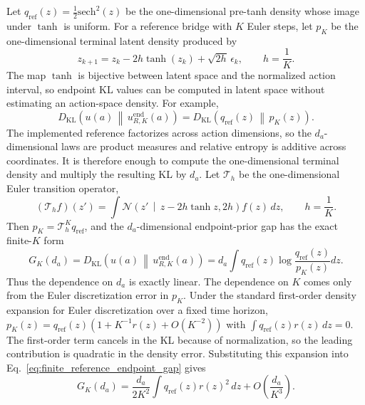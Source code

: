 \documentclass[11pt]{article}
\begin{document}
Let $q_{\mathrm{ref}}(z)=\frac{1}{2}\mathrm{sech}^2(z)$ be the one-dimensional pre-tanh density whose image under $\tanh$ is uniform. For a reference bridge with $K$ Euler steps, let $p_K$ be the one-dimensional terminal latent density produced by
\begin{equation}
  z_{k+1}
  =
  z_k
  -
  2h\tanh(z_k)
  +
  \sqrt{2h}\,\epsilon_k,
  \qquad h=\frac{1}{K}.
\end{equation}
The map $\tanh$ is bijective between latent space and the normalized action interval, so endpoint KL values can be computed in latent space without estimating an action-space density. For example,
\begin{equation}
  D_{\mathrm{KL}}\!\left(u(a)\,\middle\|\,u^{\mathrm{end}}_{R,K}(a)\right)
  =
  D_{\mathrm{KL}}\!\left(q_{\mathrm{ref}}(z)\,\middle\|\,p_K(z)\right).
\end{equation}
The implemented reference factorizes across action dimensions, so the $d_a$-dimensional laws are product measures and relative entropy is additive across coordinates. It is therefore enough to compute the one-dimensional terminal density and multiply the resulting KL by $d_a$. Let $\mathcal T_h$ be the one-dimensional Euler transition operator,
\begin{equation}
  (\mathcal T_h f)(z')
  =
  \int
  \mathcal N\!\left(
    z'
    \,\middle|\,
    z-2h\tanh z,
    2h
  \right)
  f(z)\,dz,
  \qquad h=\frac{1}{K}.
\end{equation}
Then $p_K=\mathcal T_h^K q_{\mathrm{ref}}$, and the $d_a$-dimensional endpoint-prior gap has the exact finite-$K$ form
\begin{equation}
  G_K(d_a)
  =
  D_{\mathrm{KL}}\!\left(u(a)\,\middle\|\,u^{\mathrm{end}}_{R,K}(a)\right)
  =
  d_a
  \int
  q_{\mathrm{ref}}(z)
  \log
  \frac{q_{\mathrm{ref}}(z)}{p_K(z)}
  dz.
  \label{eq:finite_reference_endpoint_gap}
\end{equation}
Thus the dependence on $d_a$ is exactly linear. The dependence on $K$ comes only from the Euler discretization error in $p_K$. Under the standard first-order density expansion for Euler discretization over a fixed time horizon, $p_K(z)=q_{\mathrm{ref}}(z)(1+K^{-1}r(z)+O(K^{-2}))$ with $\int q_{\mathrm{ref}}(z)r(z)\,dz=0$. The first-order term cancels in the KL because of normalization, so the leading contribution is quadratic in the density error. Substituting this expansion into Eq.~\eqref{eq:finite_reference_endpoint_gap} gives
\begin{equation}
  G_K(d_a)
  =
  \frac{d_a}{2K^2}
  \int
  q_{\mathrm{ref}}(z)r(z)^2\,dz
  +
  O\!\left(\frac{d_a}{K^3}\right).
  \label{eq:finite_reference_gap_rate}
\end{equation}
\end{document}

